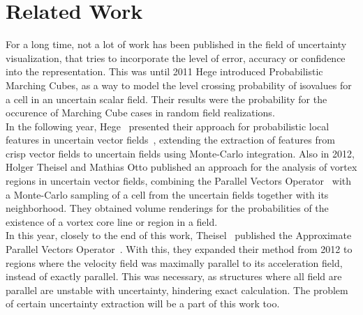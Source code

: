 \chapter{Related Work}

For a long time, not a lot of work has been published in the field of
uncertainty visualization, that tries to incorporate the level of error,
accuracy or confidence into the representation. This was until 2011 Hege
 introduced Probabilistic Marching Cubes, as a way to
model the level crossing probability of isovalues for a cell in an
uncertain scalar field. Their results were the probability for the
occurence of Marching Cube cases in random field realizations.\\
\indent In the following year, Hege \etal\ presented their approach for
probabilistic local features in uncertain vector fields~\cite{PLF},
extending the extraction of features from crisp vector fields to
uncertain fields using Monte-Carlo integration. Also in 2012, Holger
Theisel and Mathias Otto published an approach for the analysis of
vortex regions in uncertain vector fields, combining the Parallel
Vectors Operator~\cite{PV} with a Monte-Carlo sampling of a cell from
the uncertain fields together with its neighborhood. They obtained
volume renderings for the probabilities of the existence of a vortex
core line or region in a field.\\
\indent In this year, closely to the end of this work, Theisel \etal\
published the Approximate Parallel Vectors Operator~\cite{APV}. With
this, they expanded their method from 2012 to regions where the velocity
field was maximally parallel to its acceleration field, instead of
exactly parallel. This was necessary, as structures where all field are
parallel are unstable with uncertainty, hindering exact calculation. The
problem of certain uncertainty extraction will be a part of this work
too.\\